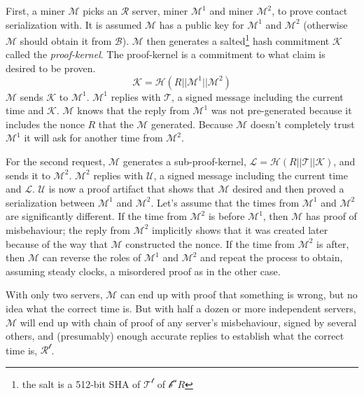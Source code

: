\documentclass[letterpaper,11pt]{article}
\begin{document}
First, a miner $\mathcal{M}$ picks an $\mathcal{R}$ server, miner $\mathcal{M^1}$ and miner $\mathcal{M^2}$, to prove contact serialization with. It is assumed $\mathcal{M}$ has a public key for $\mathcal{M^1}$ and $\mathcal{M^2}$ (otherwise $\mathcal{M}$ should obtain it from $\mathcal{B}$). $\mathcal{M}$ then generates a salted\footnote{the salt is a 512-bit SHA of $\mathcal{T^t}$ of $\mathcal{b^n}$$R$} hash commitment $\mathcal{K}$ called the \textit{proof-kernel}. The proof-kernel is a commitment to what claim is desired to be proven. $$\mathcal{K} = \mathcal{H}(R || \mathcal{M^1} || \mathcal{M^2})$$ $\mathcal{M}$ sends $\mathcal{K}$ to $\mathcal{M^1}$. $\mathcal{M^1}$ replies with $\mathcal{T}$, a signed message including the current time and $\mathcal{K}$. $\mathcal{M}$ knows that the reply from $\mathcal{M^1}$ was not pre-generated because it includes the nonce $R$ that the $\mathcal{M}$ generated. Because $\mathcal{M}$ doesn't completely trust $\mathcal{M^1}$ it will ask for another time from $\mathcal{M^2}$.\newline

For the second request, $\mathcal{M}$ generates a sub-proof-kernel, $\mathcal{L} = \mathcal{H}(R || \mathcal{T} || \mathcal{K})$, and sends it to $\mathcal{M^2}$. $\mathcal{M^2}$ replies with $\mathcal{U}$, a signed message including the current time and $\mathcal{L}$. $\mathcal{U}$ is now a proof artifact that shows that $\mathcal{M}$ desired and then proved a serialization between $\mathcal{M^1}$ and $\mathcal{M^2}$. Let's assume that the times from $\mathcal{M^1}$ and $\mathcal{M^2}$ are significantly different. If the time from $\mathcal{M^2}$ is before $\mathcal{M^1}$, then $\mathcal{M}$ has proof of misbehaviour; the reply from $\mathcal{M^2}$ implicitly shows that it was created later because of the way that $\mathcal{M}$ constructed the nonce. If the time from $\mathcal{M^2}$ is after, then $\mathcal{M}$ can reverse the roles of $\mathcal{M^1}$ and $\mathcal{M^2}$ and repeat the process to obtain, assuming steady clocks, a misordered proof as in the other case.\newline

With only two servers, $\mathcal{M}$ can end up with proof that something is wrong, but no idea what the correct time is. But with half a dozen or more independent servers, $\mathcal{M}$ will end up with chain of proof of any server's misbehaviour, signed by several others, and (presumably) enough accurate replies to establish what the correct time is, $\mathcal{R^t}$.
\end{document}

